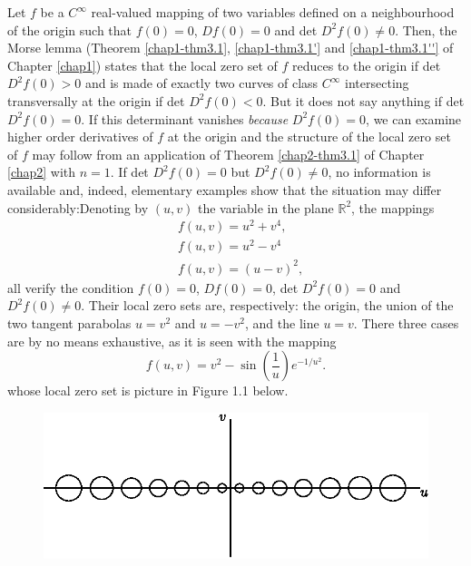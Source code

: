 Let $f$ be a $C^{\infty}$ real-valued mapping of two variables defined
on a neighbourhood of the origin such that $f(0) = 0$, $Df(0) = 0$ and
det $D^{2}f(0) \neq 0$. Then, the Morse lemma (Theorem
\ref{chap1-thm3.1}, \ref{chap1-thm3.1'} and \ref{chap1-thm3.1''} of
Chapter \ref{chap1}) states that the local zero set of $f$ reduces to
the origin if det $D^{2}f(0) > 0$ and is made of exactly two curves of
class $C^{\infty}$ intersecting transversally at the origin if det
$D^{2}f(0) < 0$. But it does not say anything if det $D^{2}f(0) =
0$. If this determinant vanishes {\em because} $D^{2}f(0) = 0$, we can
examine higher order derivatives of $f$ at the origin and the structure
of the local zero set of $f$ may follow from an application of Theorem
\ref{chap2-thm3.1} of Chapter \ref{chap2} with $n = 1$. If det
$D^{2}f(0) = 0$ but $D^{2}f(0) \neq 0$, no information is available
and, indeed, elementary examples show that the situation may differ
considerably:\pageoriginale  Denoting by $(u, v)$ the variable in the
plane $\mathbb{R}^{2}$, the mappings
\begin{align*}
& f(u, v) = u^{2} + v^{4},\\
& f(u, v) = u^{2} - v^{4}\\
& f(u, v) = (u-v)^{2},
\end{align*}
all verify the condition $f(0) = 0$, $Df(0) = 0$, det $D^{2}f(0) = 0$
and $D^{2}f(0) \neq 0$. Their local zero sets are, respectively: the
origin, the union of the two tangent parabolas $u = v^{2}$ and $u =
-v^{2}$, and the line $u = v$. There three cases are by no means
exhaustive, as it is seen with the mapping 
$$
f(u, v) = v^{2} - \sin\left(\frac{1}{u}\right) e^{-1/u^{2}}.
$$
whose local zero set is picture in Figure 1.1 below.
\begin{figure}[H]
\centering
\includegraphics{figure/fig76-1.1_1.eps}
\caption{}
\end{figure}


